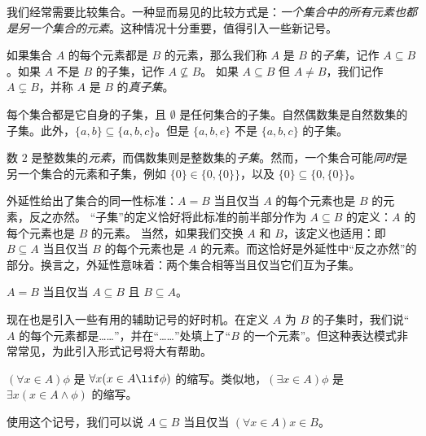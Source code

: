 \documentclass[../../../include/open-logic-section]{subfiles}
\begin{document}

\begin{explain}
我们经常需要比较集合。一种显而易见的比较方式是：\emph{一个集合中的所有元素也都是另一个集合的元素}。这种情况十分重要，值得引入一些新记号。
\end{explain}

\begin{defn}[子集]
如果集合 $A$ 的每个元素都是 $B$ 的元素，那么我们称 $A$ 是 $B$ 的\emph{子集}，记作 $A \subseteq B$。如果 $A$ 不是 $B$ 的子集，记作 $A \not\subseteq B$。
如果 $A \subseteq B$ 但 $A \neq B$，我们记作 $A \subsetneq B$，并称 $A$ 是 $B$ 的\emph{真子集}。
\end{defn}

\begin{ex}
每个集合都是它自身的子集，且 $\emptyset$ 是任何集合的子集。自然偶数集是自然数集的子集。此外，$\{ a, b \} \subseteq \{ a, b, c \}$。但是 $\{ a, b, e \}$ 不是 $\{ a, b, c \}$ 的子集。
\end{ex}

\begin{ex}
数 $2$ 是整数集的\emph{元素}，而偶数集则是整数集的\emph{子集}。然而，一个集合可能\emph{同时}是另一个集合的元素和子集，例如 $\{0\} \in \{0, \{0\}\}$，以及 $\{0\} \subseteq \{0,
\{0\}\}$。
\end{ex}

外延性给出了集合的同一性标准：$A = B$ 当且仅当 $A$ 的每个元素也是 $B$ 的元素，反之亦然。
“子集”的定义恰好将此标准的前半部分作为 $A \subseteq B$ 的定义：$A$ 的每个元素也是 $B$ 的元素。
当然，如果我们交换 $A$ 和 $B$，该定义也适用：即 $B \subseteq A$ 当且仅当 $B$ 的每个元素也是 $A$ 的元素。而这恰好是外延性中“反之亦然”的部分。换言之，外延性意味着：两个集合相等当且仅当它们互为子集。

\begin{prop}
$A = B$ 当且仅当 $A \subseteq B$ 且 $B \subseteq A$。
\end{prop}

现在也是引入一些有用的辅助记号的好时机。在定义 $A$ 为 $B$ 的子集时，我们说“$A$ 的每个元素都是……”，并在“……”处填上了“$B$ 的一个元素”。但这种表达模式非常常见，为此引入形式记号将大有帮助。

\begin{defn}
$(\forall x \in A)\phi$ 是 $\forall x(x \in A \lif \phi)$ 的缩写。类似地，$(\exists x \in A)\phi$ 是 $\exists x(x \in A \land \phi)$ 的缩写。
\end{defn}

使用这个记号，我们可以说 $A \subseteq B$ 当且仅当 $(\forall x \in A)x \in B$。
\end{document}
